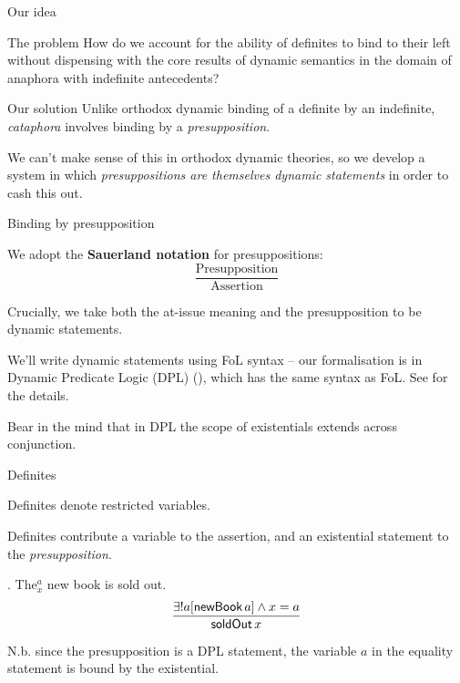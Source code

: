 \documentclass{beamer}
\begin{document}
\begin{frame}{Our idea}

  \begin{block}{The problem}
    How do we account for the ability of definites to bind to their left without dispensing with the core results of dynamic semantics in the domain of anaphora with indefinite antecedents?
  \end{block}

  \begin{block}{Our solution}
Unlike orthodox dynamic binding of a definite by an indefinite, \textit{cataphora} involves binding by a \textit{presupposition}.

We can't make sense of this in orthodox dynamic theories, so we develop a system in which \textit{presuppositions are themselves dynamic statements} in order to cash this out.
  \end{block}

\end{frame}

\begin{frame}[allowframebreaks]{Binding by presupposition}

We adopt the {\bf Sauerland notation} for presuppositions:
$$\displaystyle\frac{\text{Presupposition}}{\text{Assertion}}$$

Crucially, we take both the at-issue meaning and the presupposition to be dynamic statements.

We'll write dynamic statements using FoL syntax -- our formalisation is in Dynamic Predicate Logic (DPL) (\citealt{groenendijk_dynamic_1991}), which has the same syntax as FoL. See \citet{elliottSudoLenls,elliottSudoCat} for the details.

Bear in the mind that in DPL the scope of existentials extends across conjunction.

\end{frame}

\begin{frame}{Definites}

  \begin{description}

    \item[Orthodox theories]
      Definites denote restricted variables.

      \item[Our theory]
      Definites contribute a variable to the assertion, and an existential statement to the \textit{presupposition}.

  \end{description}

  \ex. The$^a_x$ new book is sold out.
  $$\displaystyle\frac{\exists ! a[\textsf{newBook}\,a] \wedge x = a}{\textsf{soldOut}\,x}$$

  N.b. since the presupposition is a DPL statement, the variable \(a\) in the equality statement is bound by the existential.

\end{frame}
\end{document}
